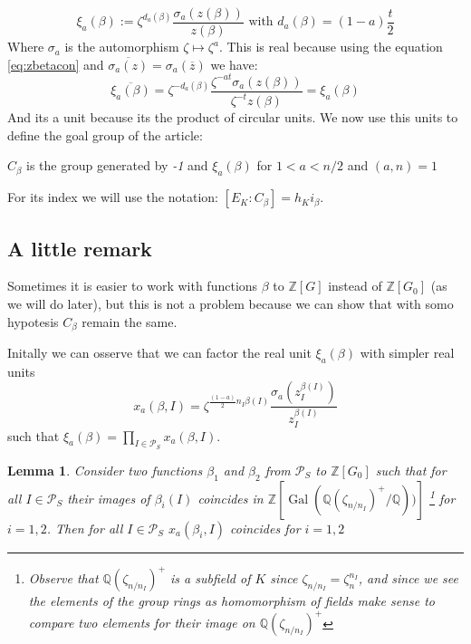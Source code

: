 \documentclass[]{article}
\theoremstyle{plain}
\newtheorem{lem}[teo]{Lemma}
\theoremstyle{remark}
\theoremstyle{definition}
\newcommand{\PS}{\mathcal{P}_S}
\newcommand{\Z}{\mathbb{Z}}
\newcommand{\Q} {\mathbb{Q}}
\DeclareMathOperator{\Gal}{Gal}
\begin{document}
	\begin{equation}\label{eq:xi}
		\xi_a (\beta) := \zeta ^{d_a (\beta)} \frac{\sigma_a (z(\beta))}{z(\beta)} \text{ with } d_a(\beta)= (1-a)\frac{t}{2}
	\end{equation}
	Where $\sigma_a$ is the automorphism $ \zeta \mapsto \zeta ^a $. This is real because using the equation \ref{eq:zbetacon} and $ \overline{\sigma_a(z)}= \sigma_a(\overline{z}) $ we have:
	\begin{equation}
		\overline{\xi_a(\beta)} = \zeta ^{-d_a(\beta)} \frac{\zeta^{-at} \sigma_a (z(\beta))}{\zeta^{-t} z(\beta)} = \xi_a(\beta)
	\end{equation}
 	And its a unit because its the product of circular units. %
 	We now use this units to define the goal group of the article:
 	\begin{tcolorbox}
 		$C_\beta $ is the group generated by \textit{-1} and $ \xi_a (\beta) $ for $ 1< a< n/2 $ and $ (a,n)=1 $
 	\end{tcolorbox}
 	For its index we will use the notation: $ [E_K : C_\beta] = h_K i_\beta $. 

	\subsection{A little remark}
	
	Sometimes it is easier to work with functions $\beta$ to $ \Z [G] $ instead of $ \Z [G_0] $ (as we will do later), but this is not a problem because we can show that with somo hypotesis $ C_\beta $ remain the same. 
	
	Initally we can osserve that we can factor the real unit $\xi_a(\beta)$ with simpler real units
	\begin{equation*}
		x_a(\beta , I) = \zeta ^{\frac{(1-a)}{2} n_I \beta (I)} \frac{\sigma_a (	z_I ^{\beta(I)})}{z_I ^{\beta(I)}} 
	\end{equation*}
	such that $ \xi_a(\beta) = \prod_{I \in \PS}  x_a(\beta , I)$. 
	
	\begin{lem}
		Consider two functions $ \beta_1 $ and $ \beta_2 $ from $ \PS $ to $ \Z[G_0] $ such that for all $ I \in \PS $ their images of $ \beta_i (I)$ coincides in $ \Z[\Gal( \Q(\zeta_{n/n_I})^+ / \Q   ))] $ \footnote{Observe that $ \Q(\zeta_{n/n_I})^+ $ is a subfield of $ K $ since $ \zeta_{n/n_I} =  \zeta_n^{n_I}$, and since we see the elements of the group rings as homomorphism of fields make sense to compare two elements for their image on $\Q(\zeta_{n/n_I})^+ $ %
		} for $ i= 1,2 $. Then for all $ I \in \PS $ $ x_a(\beta_i, I) $ coincides for $ i=1,2 $
	\end{lem}
\end{document}
